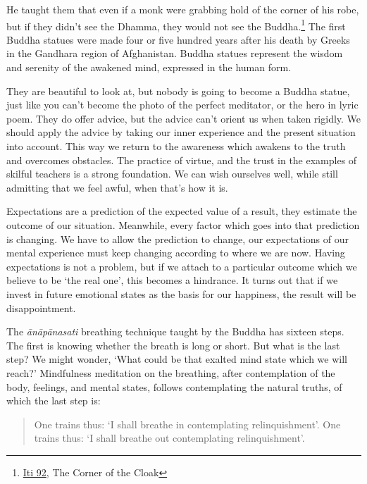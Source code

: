 He taught them that even if a monk were grabbing hold of the corner of
his robe, but if they didn't see the Dhamma, they would not see the
Buddha.\footnote{\href{https://suttacentral.net/iti92}{Iti 92}, The
  Corner of the Cloak} The first Buddha statues were made four or five
hundred years after his death by Greeks in the Gandhara region of
Afghanistan. Buddha statues represent the wisdom and serenity of the
awakened mind, expressed in the human form.

They are beautiful to look at, but nobody is going to become a Buddha
statue, just like you can't become the photo of the perfect meditator,
or the hero in lyric poem. They do offer advice, but the advice can't
orient us when taken rigidly. We should apply the advice by taking our
inner experience and the present situation into account. This way we
return to the awareness which awakens to the truth and overcomes
obstacles. The practice of virtue, and the trust in the examples of
skilful teachers is a strong foundation. We can wish ourselves well,
while still admitting that we feel awful, when that's how it is.

Expectations are a prediction of the expected value of a result, they
estimate the outcome of our situation. Meanwhile, every factor which
goes into that prediction is changing. We have to allow the prediction
to change, our expectations of our mental experience must keep changing
according to where we are now. Having expectations is not a problem, but
if we attach to a particular outcome which we believe to be `the real
one', this becomes a hindrance. It turns out that if we invest in future
emotional states as the basis for our happiness, the result will be
disappointment.

\enlargethispage*{\baselineskip}

The \emph{ānāpānasati} breathing technique taught by the Buddha has
sixteen steps. The first is knowing whether the breath is long or short.
But what is the last step? We might wonder, `What could be that exalted
mind state which we will reach?' Mindfulness meditation on the
breathing, after contemplation of the body, feelings, and mental states,
follows contemplating the natural truths, of which the last step is:

\begin{quote}
One trains thus: `I shall breathe in contemplating relinquishment'. One
trains thus: `I shall breathe out contemplating relinquishment'.

\bigskip

\end{quote}

